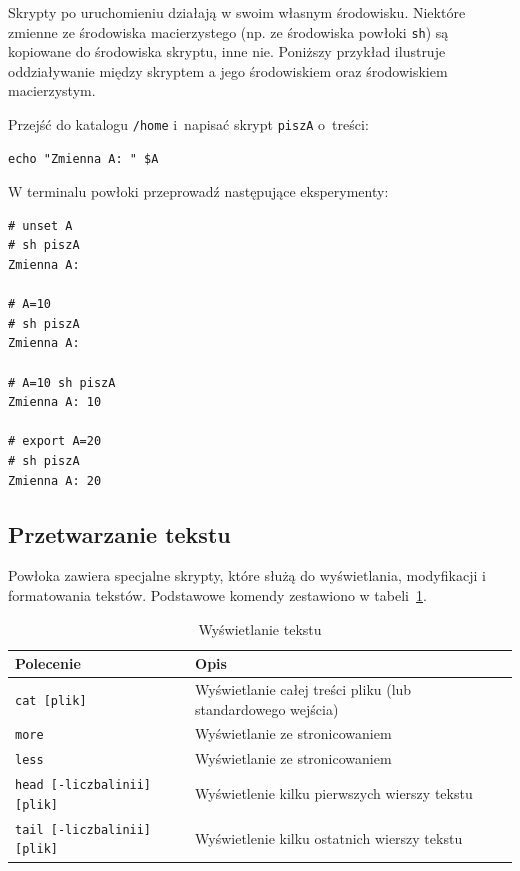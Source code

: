 \begin{example} 
Skrypty po uruchomieniu działają w swoim własnym środowisku. Niektóre zmienne ze środowiska macierzystego (np. ze środowiska powłoki \lstinline[style=MyBashStyle]{sh}) są kopiowane do środowiska skryptu, inne nie. Poniższy przykład ilustruje oddziaływanie między skryptem a jego środowiskiem oraz środowiskiem macierzystym.

Przejść do katalogu \lstinline[style=MyBashStyle]{/home} i~napisać skrypt \lstinline[style=MyBashStyle]{piszA} o~treści: 

\begin{lstlisting}[style=MyBashStyle,deletekeywords={echo}] 
echo "Zmienna A: " $A
\end{lstlisting} 

W terminalu powłoki przeprowadź następujące eksperymenty:

\begin{lstlisting}[style=MyBashStyle,deletekeywords={echo}] 
# unset A
# sh piszA
Zmienna A: 

# A=10
# sh piszA
Zmienna A: 

# A=10 sh piszA
Zmienna A: 10

# export A=20
# sh piszA
Zmienna A: 20
\end{lstlisting} 

\end{example} 

\subsection{Przetwarzanie tekstu}

Powłoka zawiera specjalne skrypty, które służą do wyświetlania, modyfikacji i formatowania tekstów. Podstawowe komendy zestawiono w tabeli~\ref{tab:wyswietl}. 

\begin{table}[h!]
\centering
\caption{Wyświetlanie tekstu}
\setlength{\arrayrulewidth}{1pt}
\setlength{\tabcolsep}{6pt}
\renewcommand{\arraystretch}{1.2}
\begin{tabular}{ |p{}|p{}|}
\hline \rowcolor{gray}
\textbf{Polecenie} & \textbf{Opis} \\ \hline
\mbox{\lstinline[style=MyBashStyle]{cat [plik]}} & Wyświetlanie całej treści pliku (lub standardowego wejścia) \\ \hline 
\mbox{\lstinline[style=MyBashStyle]{more}} & Wyświetlanie ze stronicowaniem \\ \hline 
\mbox{\lstinline[style=MyBashStyle]{less}} & Wyświetlanie ze stronicowaniem \\ \hline 
\mbox{\lstinline[style=MyBashStyle]{head [-liczbalinii] [plik]}}  & Wyświetlenie kilku pierwszych wierszy tekstu \\ \hline
\mbox{\lstinline[style=MyBashStyle]{tail [-liczbalinii] [plik]}}  & Wyświetlenie kilku ostatnich wierszy tekstu \\ \hline
\end{tabular}
\label{tab:wyswietl}
\end{table}

